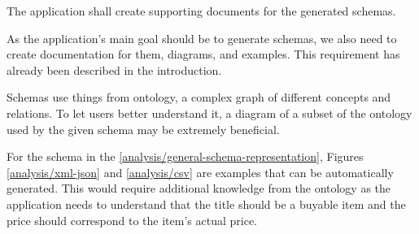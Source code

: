 \begin{requirement}
    The application shall create supporting documents for the generated schemas.
\end{requirement}

As the application's main goal should be to generate schemas, we also need to create documentation for them, diagrams, and examples. This requirement has already been described in the introduction.

Schemas use things from ontology, a complex graph of different concepts and relations. To let users better understand it, a diagram of a subset of the ontology used by the given schema may be extremely beneficial. %

For the schema in the \autoref{analysis/general-schema-representation}, Figures \ref{analysis/xml-json} and \ref{analysis/csv} are examples that can be automatically generated. This would require additional knowledge from the ontology as the application needs to understand that the title should be a buyable item and the price should correspond to the item's actual price. %